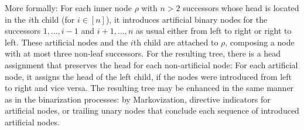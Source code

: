 \documentclass[../../document.tex]{subfiles}
\begin{document}
    More formally: For each inner node \(\rho\) with \(n > 2\) successors whose head is located in the \(i\)th child (for \(i \in [n]\)), it introduces artificial binary nodes for the successors \(1, \ldots, i-1\) and \(i+1, \ldots, n\) as usual either from left to right or right to left.
    These artificial nodes and the \(i\)th child are attached to \(\rho\), composing a node with at most three non-leaf successors.
    For the resulting tree, there is a head assignment that preserves the head for each non-artificial node:
        For each artificial node, it assigns the head of the left child, if the nodes were introduced from left to right and vice versa.
    The resulting tree may be enhanced in the same manner as in the binarization processes: by Markovization, directive indicators for artificial nodes, or trailing unary nodes that conclude each sequence of introduced artificial nodes.
\end{document}
